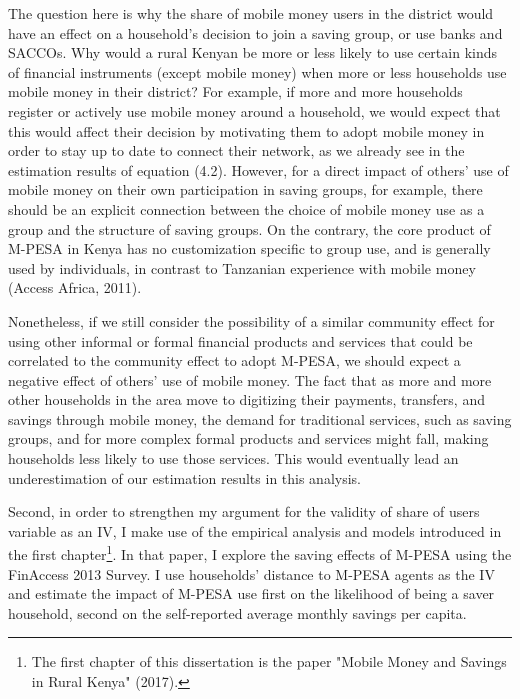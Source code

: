\documentclass[11pt]{article}
\numberwithin{equation}{section}
\begin{document}
The question here is why the share of mobile money users in the district would have an effect on a household's decision to join a saving group, or use banks and SACCOs. Why would a rural Kenyan be more or less likely to use certain kinds of financial instruments (except mobile money) when more or less households use mobile money in their district? For example, if more and more households register or actively use mobile money around a household, we would expect that this would affect their decision by motivating them to adopt mobile money in order to stay up to date to connect their network, as we already see in the estimation results of equation (4.2). However, for a direct impact of others' use of mobile money on their own participation in saving groups, for example, there should be an explicit connection between the choice of mobile money use as a group and the structure of saving groups. On the contrary, the core product of M-PESA in Kenya has no customization specific to group use, and is generally used by individuals, in contrast to Tanzanian experience with mobile money (Access Africa, 2011).

Nonetheless, if we still consider the possibility of a similar community effect for using other informal or formal financial products and services that could be correlated to the community effect to adopt M-PESA, we should expect a negative effect of others' use of mobile money. The fact that as more and more other households in the area move to digitizing their payments, transfers, and savings through mobile money, the demand for traditional services, such as saving groups, and for more complex formal products and services might fall, making households less likely to use those services. This would eventually lead an underestimation of our estimation results in this analysis.


Second, in order to strengthen my argument for the validity of share of users variable as an IV, I make use of the empirical analysis and models introduced in the first chapter\footnote{The first chapter of this dissertation is the paper "Mobile Money and Savings in Rural Kenya" (2017).}. In that paper, I explore the saving effects of M-PESA using the FinAccess 2013 Survey. I use households' distance to M-PESA agents as the IV and estimate the impact of M-PESA use first on the likelihood of being a saver household, second on the self-reported average monthly savings per capita.
\end{document}
